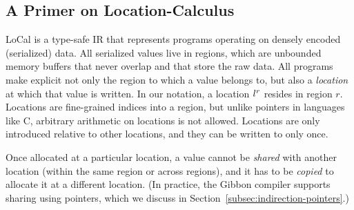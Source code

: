 \documentclass[acmsmall,acmthm=false,nonacm]{acmart}
\theoremstyle{straighttext0}
\theoremstyle{straighttext}
\newcommand{\Secref}[1]{Section~\ref{#1}}
\newcommand{\new}[1]{#1}
\begin{document}
{
\small

}


\subsection{A Primer on Location-Calculus}
\label{subsec:local-primer}

LoCal is a type-safe IR that represents programs operating on
densely encoded (serialized) data.  All serialized values live in regions,
which are unbounded memory buffers \new{that never overlap and} that store the raw data.
All programs make explicit not only the region to which a value belongs to, but
also a \textit{location} at which that value is written.
%
In our notation, a location ${l}^{r}$ resides in region $r$.
%
Locations are fine-grained indices into a region, but unlike pointers in
languages like C, arbitrary arithmetic on locations is not allowed.
Locations are only introduced relative to other locations,
\new{and they can be written to only once.}
%
\new{
Once allocated at a particular location, a value cannot be {\em shared} with another location
(within the same region or across regions), and it has to be {\em copied}
to allocate it at a different location.
%
(In practice, the Gibbon compiler supports sharing using pointers, which
we discuss in \Secref{subsec:indirection-pointers}.)
}
\end{document}
